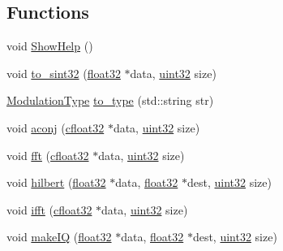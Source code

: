 \subsection*{Functions}
\begin{DoxyCompactItemize}
\item 
void \hyperlink{namespaceradio_a6db7c682d0f9aeac8cb5042717b8ae7f}{Show\+Help} ()
\item 
void \hyperlink{namespaceradio_ae4b2334c4366dcdf0311ad79d2067945}{to\+\_\+sint32} (\hyperlink{definitions_8hpp_aacdc525d6f7bddb3ae95d5c311bd06a1}{float32} $\ast$data, \hyperlink{definitions_8hpp_a1134b580f8da4de94ca6b1de4d37975e}{uint32} size)
\item 
\hyperlink{namespaceradio_a46fb7299001138f28b7f69975c58399e}{Modulation\+Type} \hyperlink{namespaceradio_a402fe28e2e2bb2be7a0d2d9f74cc640d}{to\+\_\+type} (std\+::string str)
\item 
void \hyperlink{namespaceradio_aa04bb922c40cafb00a5603f1fc6d9c26}{aconj} (\hyperlink{definitions_8hpp_a960be6b6614c08090c16574dba10a421}{cfloat32} $\ast$data, \hyperlink{definitions_8hpp_a1134b580f8da4de94ca6b1de4d37975e}{uint32} size)
\item 
void \hyperlink{namespaceradio_ab146b5bf7f1c005939b024c9c4910a77}{fft} (\hyperlink{definitions_8hpp_a960be6b6614c08090c16574dba10a421}{cfloat32} $\ast$data, \hyperlink{definitions_8hpp_a1134b580f8da4de94ca6b1de4d37975e}{uint32} size)
\item 
void \hyperlink{namespaceradio_a285a47b4ed81e5662d2b6b4bae0188d0}{hilbert} (\hyperlink{definitions_8hpp_aacdc525d6f7bddb3ae95d5c311bd06a1}{float32} $\ast$data, \hyperlink{definitions_8hpp_aacdc525d6f7bddb3ae95d5c311bd06a1}{float32} $\ast$dest, \hyperlink{definitions_8hpp_a1134b580f8da4de94ca6b1de4d37975e}{uint32} size)
\item 
void \hyperlink{namespaceradio_a51add4e2faf6d58cabc3b4a3892420eb}{ifft} (\hyperlink{definitions_8hpp_a960be6b6614c08090c16574dba10a421}{cfloat32} $\ast$data, \hyperlink{definitions_8hpp_a1134b580f8da4de94ca6b1de4d37975e}{uint32} size)
\item 
void \hyperlink{namespaceradio_a7166522e76ff88e8d482491b1b6e2275}{make\+I\+Q} (\hyperlink{definitions_8hpp_aacdc525d6f7bddb3ae95d5c311bd06a1}{float32} $\ast$data, \hyperlink{definitions_8hpp_aacdc525d6f7bddb3ae95d5c311bd06a1}{float32} $\ast$dest, \hyperlink{definitions_8hpp_a1134b580f8da4de94ca6b1de4d37975e}{uint32} size)
\end{DoxyCompactItemize}
